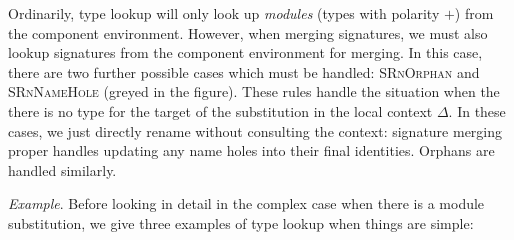 
Ordinarily, type lookup will only look up \emph{modules} (types
with polarity $+$) from the component environment.  However, when merging
signatures, we must also lookup signatures from the component environment
for merging.  In this case, there are two further possible cases which
must be handled: \textsc{SRnOrphan} and \textsc{SRnNameHole} (greyed in
the figure).  These rules handle the situation when the there is no
type for the target of the substitution in the local context $\Delta$.
In these cases, we just directly rename without consulting the context:
signature merging proper handles updating any name holes into their
final identities.  Orphans are handled similarly.



\emph{Example}. Before looking in detail in the complex case when there
is a module substitution, we give three examples of type lookup when
things are simple:

